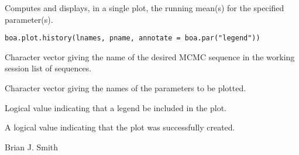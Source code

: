 \begin{Description}\relax
Computes and displays, in a single plot, the running mean(s) for the 
specified parameter(s).
\end{Description}
\begin{Usage}
\begin{verbatim}
boa.plot.history(lnames, pname, annotate = boa.par("legend"))
\end{verbatim}
\end{Usage}
\begin{Arguments}
\begin{ldescription}
\item[\code{lnames}] Character vector giving the name of the desired MCMC sequence 
in the working session list of sequences.
\item[\code{pname}] Character vector giving the names of the parameters to be plotted.
\item[\code{annotate}] Logical value indicating that a legend be included in the plot.
\end{ldescription}
\end{Arguments}
\begin{Value}
A logical value indicating that the plot was successfully created.
\end{Value}
\begin{Author}\relax
Brian J. Smith
\end{Author}
\begin{SeeAlso}\relax
{}
\end{SeeAlso}

